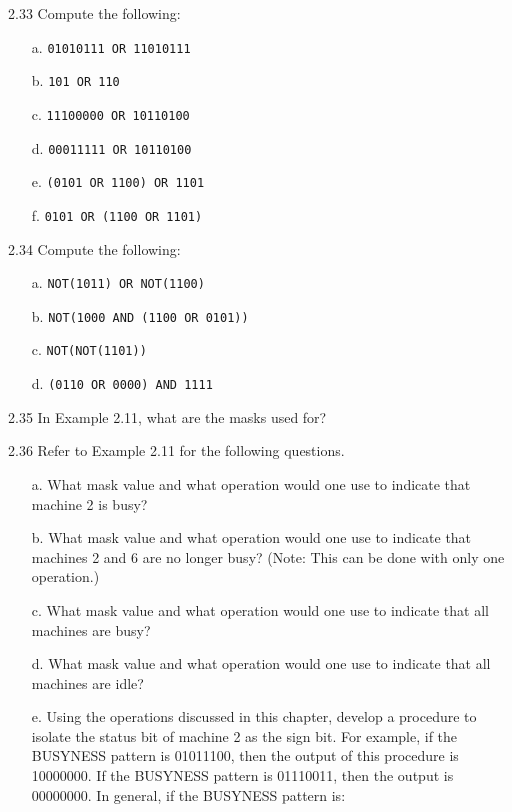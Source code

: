 \documentclass{patt}
\begin{document}
\begin{exercises}
\item[2.33] Compute the following:
\begin{enumerate}[f.]
\item[a.] {\tt 01010111 OR 11010111}
\item[b.] {\tt 101 OR 110}
\item[c.] {\tt 11100000 OR 10110100}
\item[d.] {\tt 00011111 OR 10110100}
\item[e.] {\tt (0101 OR 1100) OR 1101}
\item[f.] {\tt 0101 OR (1100 OR 1101)}
\end{enumerate}

\item[2.34] Compute the following:
\begin{enumerate}[d.]
\item[a.] {\tt NOT(1011) OR NOT(1100)}
\item[b.] {\tt NOT(1000 AND (1100 OR 0101))}
\item[c.] {\tt NOT(NOT(1101))}
\item[d.] {\tt (0110 OR 0000) AND 1111}
\end{enumerate}

\item[2.35] In Example 2.11, what are the masks used for?

\item[2.36] Refer to Example 2.11 for the following questions.

\begin{enumerate}[a.]
\item[a.] What mask value and what operation would one use to indicate
  that machine 2 is busy?
\item[b.] What mask value and what operation would one use to indicate
  that machines 2 and 6 are no longer busy? (Note: This can be done
  with only one operation.)
\item[c.] What mask value and what operation would one use to indicate
  that all machines are busy?
\item[d.] What mask value and what operation would one use to indicate
  that all machines are idle?
\item[e.] Using the operations discussed in this chapter, develop a 
  procedure to isolate the status bit of machine 2 as the sign bit. 
  For example, if the BUSYNESS pattern is 01011100, then the output 
  of this procedure is 10000000.  If the BUSYNESS pattern is 01110011, 
  then the output is 00000000. In general, if the BUSYNESS pattern is:
\smallskip


\end{enumerate}
\end{exercises}
\end{document}
